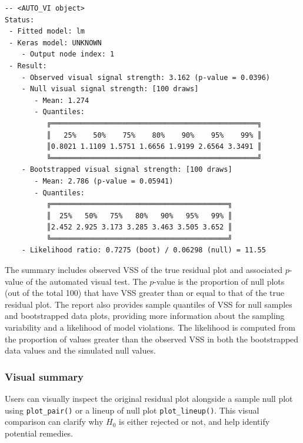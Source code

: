 \documentclass[
doublespace,
  times]{anzsauth}
\newenvironment{Shaded}{\begin{snugshade}}{\end{snugshade}}
\newcommand{\FunctionTok}[1]{\textcolor[rgb]{0.28,0.35,0.67}{#1}}
\newcommand{\NormalTok}[1]{\textcolor[rgb]{0.00,0.23,0.31}{#1}}
\newcommand{\SpecialCharTok}[1]{\textcolor[rgb]{0.37,0.37,0.37}{#1}}
\begin{document}
\begin{verbatim}
-- <AUTO_VI object>
Status:
 - Fitted model: lm
 - Keras model: UNKNOWN
    - Output node index: 1
 - Result:
    - Observed visual signal strength: 3.162 (p-value = 0.0396)
    - Null visual signal strength: [100 draws]
       - Mean: 1.274
       - Quantiles: 
          ╔═════════════════════════════════════════════════╗
          ║   25%    50%    75%    80%    90%    95%    99% ║
          ║0.8021 1.1109 1.5751 1.6656 1.9199 2.6564 3.3491 ║
          ╚═════════════════════════════════════════════════╝
    - Bootstrapped visual signal strength: [100 draws]
       - Mean: 2.786 (p-value = 0.05941)
       - Quantiles: 
          ╔══════════════════════════════════════════╗
          ║  25%   50%   75%   80%   90%   95%   99% ║
          ║2.452 2.925 3.173 3.285 3.463 3.505 3.652 ║
          ╚══════════════════════════════════════════╝
    - Likelihood ratio: 0.7275 (boot) / 0.06298 (null) = 11.55 
\end{verbatim}

The summary includes observed VSS of the true residual plot and
associated \(p\)-value of the automated visual test. The \(p\)-value is
the proportion of null plots (out of the total 100) that have VSS
greater than or equal to that of the true residual plot. The report also
provides sample quantiles of VSS for null samples and bootstrapped data
plots, providing more information about the sampling variability and a
likelihood of model violations. The likelihood is computed from the
proportion of values greater than the observed VSS in both the
bootstrapped data values and the simulated null values.

\subsubsection{Visual summary}\label{sec-autovi-visual}

Users can visually inspect the original residual plot alongside a sample
null plot using \texttt{plot\_pair()} or a lineup of null plot
\texttt{plot\_lineup()}. This visual comparison can clarify why \(H_0\)
is either rejected or not, and help identify potential remedies.

\begin{Shaded}
\end{Shaded}
\end{document}
